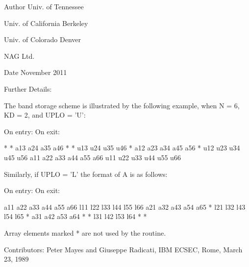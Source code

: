 \begin{DoxyAuthor}{Author}
Univ. of Tennessee 

Univ. of California Berkeley 

Univ. of Colorado Denver 

N\+A\+G Ltd. 
\end{DoxyAuthor}
\begin{DoxyDate}{Date}
November 2011 
\end{DoxyDate}
\begin{DoxyParagraph}{Further Details\+: }
\begin{DoxyVerb}  The band storage scheme is illustrated by the following example, when
  N = 6, KD = 2, and UPLO = 'U':

  On entry:                       On exit:

      *    *   a13  a24  a35  a46      *    *   u13  u24  u35  u46
      *   a12  a23  a34  a45  a56      *   u12  u23  u34  u45  u56
     a11  a22  a33  a44  a55  a66     u11  u22  u33  u44  u55  u66

  Similarly, if UPLO = 'L' the format of A is as follows:

  On entry:                       On exit:

     a11  a22  a33  a44  a55  a66     l11  l22  l33  l44  l55  l66
     a21  a32  a43  a54  a65   *      l21  l32  l43  l54  l65   *
     a31  a42  a53  a64   *    *      l31  l42  l53  l64   *    *

  Array elements marked * are not used by the routine.\end{DoxyVerb}
 
\end{DoxyParagraph}
\begin{DoxyParagraph}{Contributors\+: }
Peter Mayes and Giuseppe Radicati, I\+B\+M E\+C\+S\+E\+C, Rome, March 23, 1989 
\end{DoxyParagraph}
